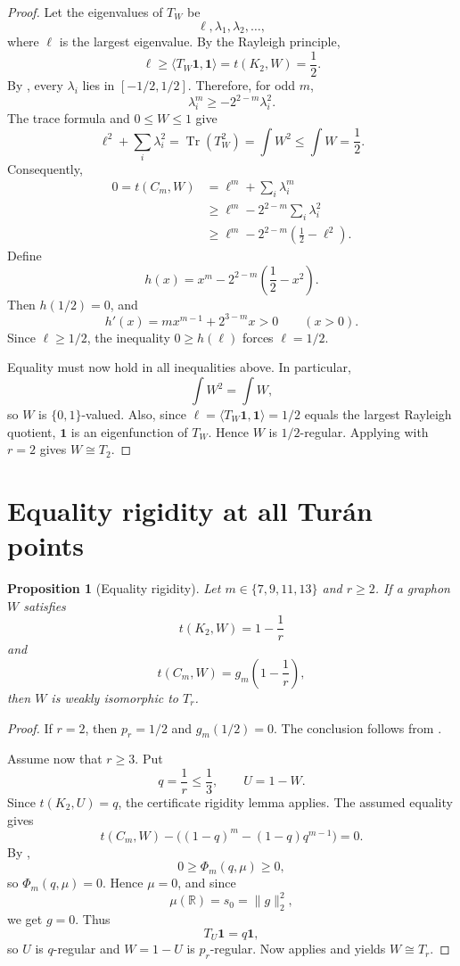 \documentclass[11pt]{article}
\newtheorem{proposition}[theorem]{Proposition}
\DeclareMathOperator{\Tr}{Tr}
\newcommand{\one}{\mathbf 1}
\begin{document}
\begin{proof}
Let the eigenvalues of \(T_W\) be
\[
        \ell,\lambda_1,\lambda_2,\ldots,
\]
where \(\ell\) is the largest eigenvalue.  By the Rayleigh principle,
\[
        \ell\ge \langle T_W\one,\one\rangle=t(K_2,W)=\frac12.
\]
By , every \(\lambda_i\) lies in \([-1/2,1/2]\).  Therefore,
for odd \(m\),
\[
        \lambda_i^m\ge -2^{2-m}\lambda_i^2.
\]
The trace formula and \(0\le W\le1\) give
\[
        \ell^2+\sum_i\lambda_i^2
        =\Tr(T_W^2)
        =\int W^2
        \le \int W
        =\frac12.
\]
Consequently,
\[
\begin{aligned}
0=t(C_m,W)
&=\ell^m+\sum_i\lambda_i^m\\
&\ge \ell^m-2^{2-m}\sum_i\lambda_i^2\\
&\ge \ell^m-2^{2-m}\left(\frac12-\ell^2\right).
\end{aligned}
\]
Define
\[
        h(x)=x^m-2^{2-m}\left(\frac12-x^2\right).
\]
Then \(h(1/2)=0\), and
\[
        h'(x)=mx^{m-1}+2^{3-m}x>0
        \qquad (x>0).
\]
Since \(\ell\ge1/2\), the inequality \(0\ge h(\ell)\) forces
\(\ell=1/2\).

Equality must now hold in all inequalities above.  In particular,
\[
        \int W^2=\int W,
\]
so \(W\) is \(\{0,1\}\)-valued.  Also, since
\(\ell=\langle T_W\one,\one\rangle=1/2\) equals the largest Rayleigh quotient,
\(\one\) is an eigenfunction of \(T_W\).  Hence \(W\) is \(1/2\)-regular.
Applying  with \(r=2\) gives
\(W\cong T_2\).
\end{proof}

\section{Equality rigidity at all Tur\'an points}

\begin{proposition}[Equality rigidity]
\label{prop:equality-rigidity}
Let \(m\in\{7,9,11,13\}\) and \(r\ge2\).  If a graphon \(W\) satisfies
\[
        t(K_2,W)=1-\frac1r
\]
and
\[
        t(C_m,W)=g_m\left(1-\frac1r\right),
\]
then \(W\) is weakly isomorphic to \(T_r\).
\end{proposition}

\begin{proof}
If \(r=2\), then \(p_r=1/2\) and \(g_m(1/2)=0\).  The conclusion follows from
.

Assume now that \(r\ge3\).  Put
\[
        q=\frac1r\le\frac13,
        \qquad U=1-W.
\]
Since \(t(K_2,U)=q\), the certificate rigidity lemma applies.  The assumed
equality gives
\[
        t(C_m,W)-\bigl((1-q)^m-(1-q)q^{m-1}\bigr)=0.
\]
By ,
\[
        0\ge \Phi_m(q,\mu)\ge0,
\]
so \(\Phi_m(q,\mu)=0\).  Hence \(\mu=0\), and since
\[
        \mu(\mathbb R)=s_0=\|g\|_2^2,
\]
we get \(g=0\).  Thus
\[
        T_U\one=q\one,
\]
so \(U\) is \(q\)-regular and \(W=1-U\) is \(p_r\)-regular.  Now
 applies and yields \(W\cong T_r\).
\end{proof}
\end{document}
